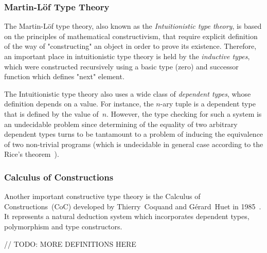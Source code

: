 \documentclass[article]{aaltoseries}
\begin{document}
\subsubsection{Martin-Löf Type Theory}
The Martin-Löf type theory, also known as the \textit{Intuitionistic type theory}, is based on the principles of mathematical constructivism, that require explicit definition of the way of "constructing" an object in order to prove its existence. Therefore, an important place in intuitionistic type theory is held by the \textit{inductive types}, which were constructed recursively using a basic type (zero) and successor function which defines "next" element.

The Intuitionistic type theory also uses a wide class of \textit{dependent types}, whose definition depends on a value. For instance, the $n$-ary tuple is a dependent type that is defined by the value of~$n$. However, the type checking for such a system is an undecidable problem since determining of the equality of two arbitrary dependent types turns to be tantamount to a problem of inducing the equivalence of two non-trivial programs (which is undecidable in general case according to the Rice's theorem~\cite{Rice53}).



\subsubsection{Calculus of Constructions}

Another important constructive type theory is the Calculus of Constructions~(CoC) developed by Thierry~Coquand and Gérard~Huet in 1985~\cite{Coq85}. It represents a natural deduction system which incorporates dependent types, polymorphism and type constructors.

// TODO: MORE DEFINITIONS HERE
\end{document}
